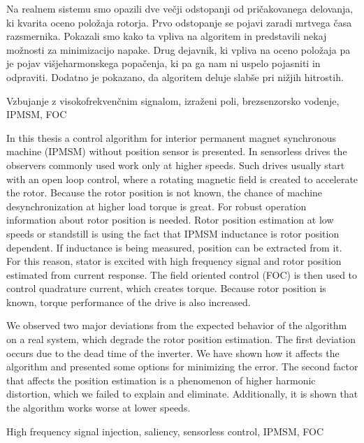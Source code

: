 \documentclass[a4paper,twoside,openright,12pt,slovene]{book}
\begin{document}
Na realnem sistemu smo opazili dve večji odstopanji od pričakovanega delovanja, ki kvarita oceno položaja rotorja. Prvo odstopanje se pojavi zaradi mrtvega časa razsmernika. Pokazali smo kako ta vpliva na 
algoritem in predstavili nekaj možnosti za minimizacijo napake. Drug dejavnik, ki vpliva na oceno položaja pa je pojav višjeharmonskega popačenja, ki pa ga nam ni uspelo pojasniti in odpraviti. 
Dodatno je pokazano, da algoritem deluje slabše pri nižjih hitrostih.

\kljucnebesede
Vzbujanje z visokofrekvenčnim signalom, izraženi poli, brezsenzorsko vodenje, IPMSM, FOC



\abstract

In this thesis a control algorithm for interior permanent magnet synchronous machine (IPMSM) without position sensor is presented. In sensorless drives the observers commonly used work only at higher speeds. 
Such drives usually start with an open loop control, where a rotating magnetic field is created to accelerate the rotor. Because the rotor position is not known, the chance of machine desynchronization 
at higher load torque is great. For robust operation information about rotor position is needed.
Rotor position estimation at low speeds or standstill is using the fact that IPMSM inductance is rotor position dependent. If inductance is being measured, position can be extracted from it. 
For this reason, stator is excited with high frequency signal and rotor position estimated from current response. The field oriented control (FOC) is then used to control quadrature current, 
which creates torque. Because rotor position is known, torque performance of the drive is also increased.

We observed two major deviations from the expected behavior of the algorithm on a real system, which degrade the rotor position estimation. The first deviation occurs due to the dead time of the inverter.
We have shown how it affects the algorithm and presented some options for minimizing the error. The second factor that affects the position estimation is a phenomenon of higher harmonic distortion, which we 
failed to explain and eliminate. Additionally, it is shown that the algorithm works worse at lower speeds.

\keywords
High frequency signal injection, saliency, sensorless control, IPMSM, FOC
\end{document}
